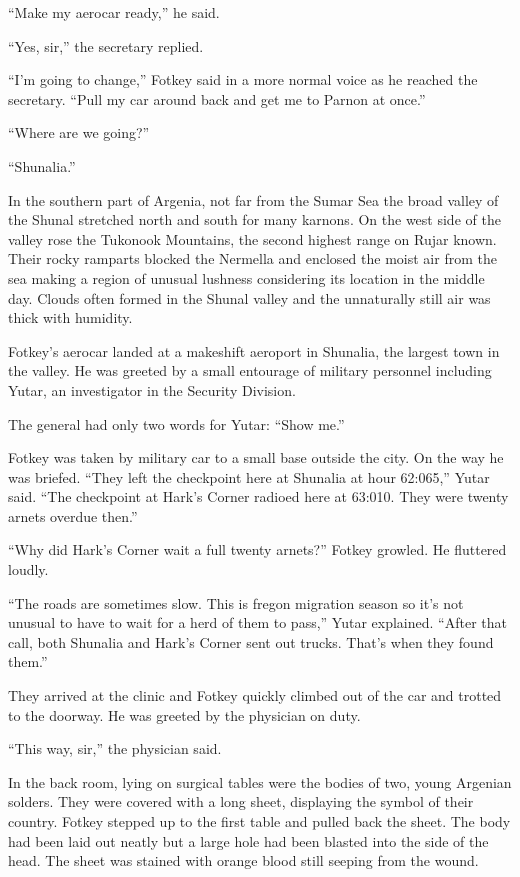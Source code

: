 ``Make my aerocar ready,'' he said.

``Yes, sir,'' the secretary replied.

``I'm going to change,'' Fotkey said in a more normal voice as he reached the secretary. ``Pull
my car around back and get me to Parnon at once.''

``Where are we going?''

``Shunalia.''

In the southern part of Argenia, not far from the Sumar Sea the broad valley of the Shunal
stretched north and south for many karnons. On the west side of the valley rose the Tukonook
Mountains, the second highest range on Rujar known. Their rocky ramparts blocked the Nermella
and enclosed the moist air from the sea making a region of unusual lushness considering its
location in the middle day. Clouds often formed in the Shunal valley and the unnaturally still
air was thick with humidity.

Fotkey's aerocar landed at a makeshift aeroport in Shunalia, the largest town in the valley. He
was greeted by a small entourage of military personnel including Yutar, an investigator in the
Security Division.

The general had only two words for Yutar: ``Show me.''

Fotkey was taken by military car to a small base outside the city. On the way he was briefed.
``They left the checkpoint here at Shunalia at hour 62:065,'' Yutar said. ``The checkpoint at
Hark's Corner radioed here at 63:010. They were twenty arnets overdue then.''

``Why did Hark's Corner wait a full twenty arnets?'' Fotkey growled. He fluttered loudly.

``The roads are sometimes slow. This is fregon migration season so it's not unusual to have to
wait for a herd of them to pass,'' Yutar explained. ``After that call, both Shunalia and
Hark's Corner sent out trucks. That's when they found them.''

They arrived at the clinic and Fotkey quickly climbed out of the car and trotted to the doorway.
He was greeted by the physician on duty.

``This way, sir,'' the physician said.

In the back room, lying on surgical tables were the bodies of two, young Argenian solders. They
were covered with a long sheet, displaying the symbol of their country. Fotkey stepped up to the
first table and pulled back the sheet. The body had been laid out neatly but a large hole had
been blasted into the side of the head. The sheet was stained with orange blood still seeping
from the wound.

